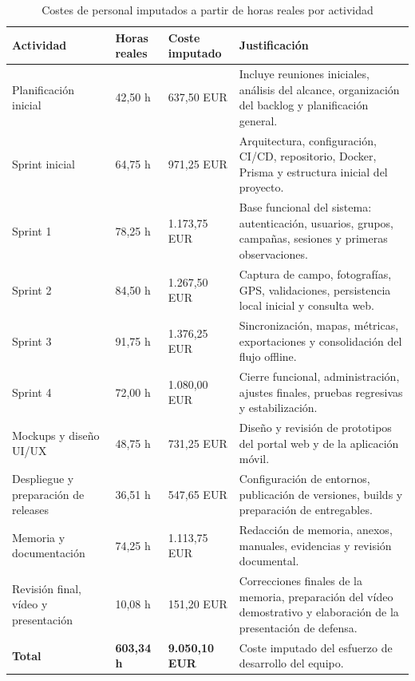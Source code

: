 \begin{table}[H]
\centering
\caption{Costes de personal imputados a partir de horas reales por actividad}
\label{tab:costes_personal}
\small
\renewcommand{\arraystretch}{1.18}
\begin{tabularx}{\textwidth}{p{4.2cm}p{2.2cm}p{2.4cm}X}
\toprule
\textbf{Actividad} & \textbf{Horas reales} & \textbf{Coste imputado} & \textbf{Justificación} \\
\midrule
Planificación inicial & 42,50 h & 637,50 EUR & Incluye reuniones iniciales, análisis del alcance, organización del backlog y planificación general. \\
Sprint inicial & 64,75 h & 971,25 EUR & Arquitectura, configuración, CI/CD, repositorio, Docker, Prisma y estructura inicial del proyecto. \\
Sprint 1 & 78,25 h & 1.173,75 EUR & Base funcional del sistema: autenticación, usuarios, grupos, campañas, sesiones y primeras observaciones. \\
Sprint 2 & 84,50 h & 1.267,50 EUR & Captura de campo, fotografías, GPS, validaciones, persistencia local inicial y consulta web. \\
Sprint 3 & 91,75 h & 1.376,25 EUR & Sincronización, mapas, métricas, exportaciones y consolidación del flujo offline. \\
Sprint 4 & 72,00 h & 1.080,00 EUR & Cierre funcional, administración, ajustes finales, pruebas regresivas y estabilización. \\
Mockups y diseño UI/UX & 48,75 h & 731,25 EUR & Diseño y revisión de prototipos del portal web y de la aplicación móvil. \\
Despliegue y preparación de releases & 36,51 h & 547,65 EUR & Configuración de entornos, publicación de versiones, builds y preparación de entregables. \\
Memoria y documentación & 74,25 h & 1.113,75 EUR & Redacción de memoria, anexos, manuales, evidencias y revisión documental. \\
Revisión final, vídeo y presentación & 10,08 h & 151,20 EUR & Correcciones finales de la memoria, preparación del vídeo demostrativo y elaboración de la presentación de defensa. \\
\midrule
\textbf{Total} & \textbf{603,34 h} & \textbf{9.050,10 EUR} & Coste imputado del esfuerzo de desarrollo del equipo. \\
\bottomrule
\end{tabularx}
\end{table}

